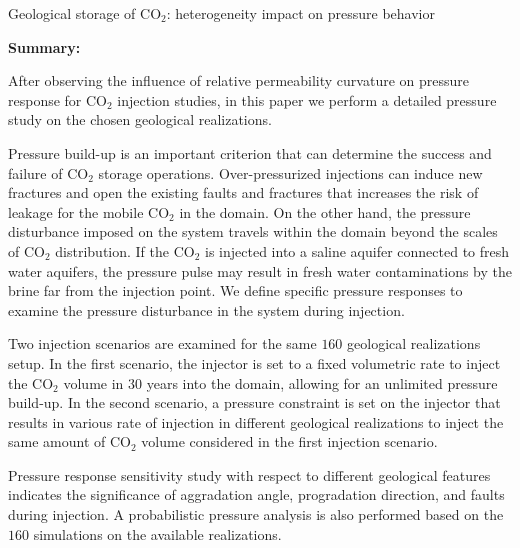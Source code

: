 %
%
{Geological storage of CO$_2$: heterogeneity impact on pressure behavior}
{\textbf{Summary:}

After observing the influence of relative permeability curvature on pressure
response for $\mbox{CO}_2$ injection studies, in this paper we perform a
detailed pressure study on the chosen geological realizations.

Pressure build-up is an important criterion that can determine the success and failure of
$\mbox{CO}_2$ storage operations. Over-pressurized injections can induce
new fractures and open the existing faults and fractures that increases the risk
of leakage for the mobile $\mbox{CO}_2$ in the domain. On the other
hand, the pressure disturbance imposed on the system travels within the
domain beyond the scales of $\mbox{CO}_2$ distribution. If the CO$_2$ is
injected into a saline aquifer connected to fresh water aquifers, the pressure
pulse may result in fresh water contaminations by the brine far from the
injection point. We define specific pressure responses to examine the pressure
disturbance in the system during injection.

Two injection scenarios are examined for the same $160$ geological realizations
setup. In the first scenario, the injector is set to a fixed volumetric rate to
inject the $\mbox{CO}_2$ volume in $30$ years into the domain, allowing for an
unlimited pressure build-up. In the second scenario, a pressure constraint is
set on the injector that results in various rate of injection in different
geological realizations to inject the same amount of $\mbox{CO}_2$ volume
considered in the first injection scenario. 

Pressure response sensitivity study with respect to different geological
features indicates the significance of aggradation angle, progradation
direction, and faults during injection. A probabilistic pressure analysis is
also performed based on the $160$ simulations on the available realizations.
}


